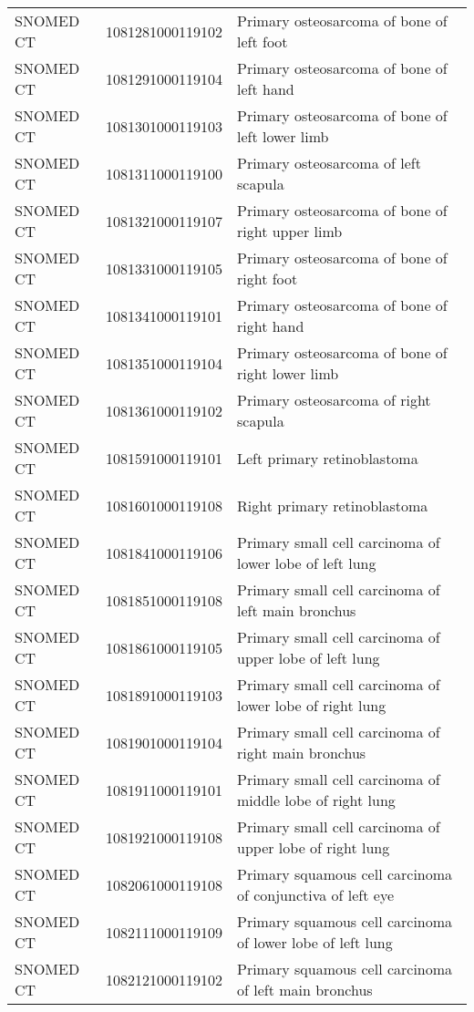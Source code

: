 \begin{longtable}{p{}p{}p{}}
  SNOMED CT & 1081281000119102 & Primary osteosarcoma of bone of left foot \\ 
  SNOMED CT & 1081291000119104 & Primary osteosarcoma of bone of left hand \\ 
  SNOMED CT & 1081301000119103 & Primary osteosarcoma of bone of left lower limb \\ 
  SNOMED CT & 1081311000119100 & Primary osteosarcoma of left scapula \\ 
  SNOMED CT & 1081321000119107 & Primary osteosarcoma of bone of right upper limb \\ 
  SNOMED CT & 1081331000119105 & Primary osteosarcoma of bone of right foot \\ 
  SNOMED CT & 1081341000119101 & Primary osteosarcoma of bone of right hand \\ 
  SNOMED CT & 1081351000119104 & Primary osteosarcoma of bone of right lower limb \\ 
  SNOMED CT & 1081361000119102 & Primary osteosarcoma of right scapula \\ 
  SNOMED CT & 1081591000119101 & Left primary retinoblastoma \\ 
  SNOMED CT & 1081601000119108 & Right primary retinoblastoma \\ 
  SNOMED CT & 1081841000119106 & Primary small cell carcinoma of lower lobe of left lung \\ 
  SNOMED CT & 1081851000119108 & Primary small cell carcinoma of left main bronchus \\ 
  SNOMED CT & 1081861000119105 & Primary small cell carcinoma of upper lobe of left lung \\ 
  SNOMED CT & 1081891000119103 & Primary small cell carcinoma of lower lobe of right lung \\ 
  SNOMED CT & 1081901000119104 & Primary small cell carcinoma of right main bronchus \\ 
  SNOMED CT & 1081911000119101 & Primary small cell carcinoma of middle lobe of right lung \\ 
  SNOMED CT & 1081921000119108 & Primary small cell carcinoma of upper lobe of right lung \\ 
  SNOMED CT & 1082061000119108 & Primary squamous cell carcinoma of conjunctiva of left eye \\ 
  SNOMED CT & 1082111000119109 & Primary squamous cell carcinoma of lower lobe of left lung \\ 
  SNOMED CT & 1082121000119102 & Primary squamous cell carcinoma of left main bronchus \\ 

\end{longtable}
